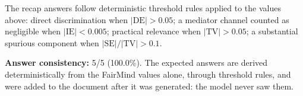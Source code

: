 \documentclass[11pt]{article}
\begin{document}
\vspace{1em}
\noindent\footnotesize
The recap answers follow deterministic threshold rules applied to the values above: direct discrimination when $|\mathrm{DE}| > 0.05$; a mediator channel counted as negligible when $|\mathrm{IE}| < 0.005$; practical relevance when $|\mathrm{TV}| > 0.05$; a substantial spurious component when $|\mathrm{SE}| / |\mathrm{TV}| > 0.1$.


\vspace{1em}
\noindent\textbf{Answer consistency:} 5/5 (100.0\%). The expected answers are derived deterministically from the FairMind values alone, through threshold rules, and were added to the document after it was generated: the model never saw them.
\end{document}
